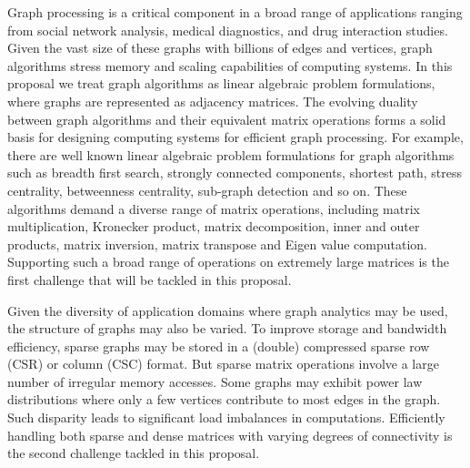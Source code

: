 \noindent
Graph processing is a critical component in a broad range of applications ranging from social network analysis, medical diagnostics, and drug interaction studies.  
Given the vast size of these graphs with billions of edges and vertices, graph algorithms stress memory and scaling capabilities of computing systems. 
In this proposal we treat graph algorithms as linear algebraic problem formulations, where graphs are represented as adjacency matrices.  
The evolving duality between graph algorithms and their equivalent matrix operations forms a solid basis for 
designing computing systems %
for efficient graph processing.
For example, there are well known linear algebraic problem formulations for graph algorithms such as breadth first search, strongly connected components, shortest path, stress centrality, betweenness centrality, sub-graph detection and so on.  
These algorithms demand a diverse range of matrix operations, including matrix multiplication, Kronecker product,  matrix decomposition, inner and outer products, matrix inversion, matrix transpose and Eigen value computation.  
Supporting such a broad range of operations on extremely large matrices is the first challenge that will be tackled in this proposal. 


Given the diversity of application domains where graph analytics may be used, the structure of graphs may also be varied. 
To improve storage and bandwidth efficiency, sparse graphs may be stored in  a (double) compressed sparse row (CSR) or column (CSC) format. 
But sparse matrix operations involve a large number of irregular memory accesses.
Some graphs may exhibit power law distributions where only a few vertices contribute to most edges in the graph. 
Such disparity leads to significant load imbalances in computations.  
Efficiently handling both sparse and dense matrices with varying degrees of connectivity is the second challenge tackled in this proposal. 

